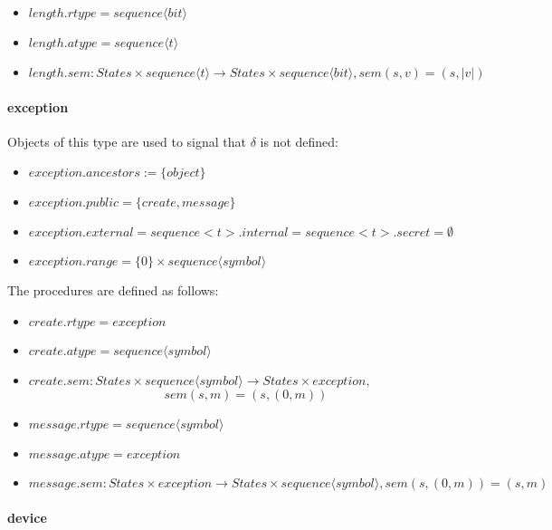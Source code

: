 \begin{itemize}
\item $length.rtype = sequence \langle bit \rangle$
\item $length.atype = sequence \langle t \rangle$
\item $length.sem: States \times sequence \langle t \rangle \rightarrow States \times sequence \langle bit \rangle, sem(s, v) = (s,\vert v \vert)$
\end{itemize}

\paragraph{exception}

Objects of this type are used to signal that $\delta$ is not defined:

\begin{itemize}
\item $exception.ancestors := \lbrace object \rbrace$
\item $exception.public = \lbrace create, message\rbrace$
\item $exception.external = sequence<t>.internal = sequence<t>.secret = \emptyset$
\item $exception.range = \lbrace 0 \rbrace \times sequence\langle symbol\rangle$
\end{itemize}

The procedures are defined as follows:

\begin{itemize}
\item $create.rtype = exception$
\item $create.atype = sequence\langle symbol\rangle$
\item $create.sem: States \times sequence\langle symbol\rangle \rightarrow States \times exception,$\[ sem(s, m) = (s, (0,m))\]
\end{itemize}


\begin{itemize}
\item $message.rtype = sequence\langle symbol\rangle$
\item $message.atype = exception$
\item $message.sem: States \times exception \rightarrow States \times sequence\langle symbol\rangle, sem(s, (0, m)) = (s,m)$
\end{itemize}


\paragraph{device}

